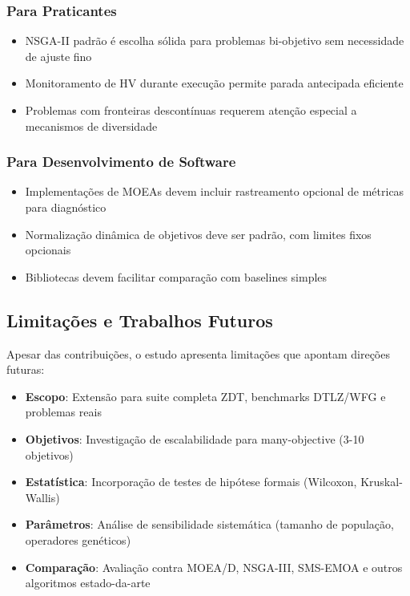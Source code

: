 \subsubsection{Para Praticantes}

\begin{itemize}
    \item NSGA-II padrão é escolha sólida para problemas bi-objetivo sem necessidade de ajuste fino
    \item Monitoramento de HV durante execução permite parada antecipada eficiente
    \item Problemas com fronteiras descontínuas requerem atenção especial a mecanismos de diversidade
\end{itemize}

\subsubsection{Para Desenvolvimento de Software}

\begin{itemize}
    \item Implementações de MOEAs devem incluir rastreamento opcional de métricas para diagnóstico
    \item Normalização dinâmica de objetivos deve ser padrão, com limites fixos opcionais
    \item Bibliotecas devem facilitar comparação com baselines simples
\end{itemize}

\subsection{Limitações e Trabalhos Futuros}

Apesar das contribuições, o estudo apresenta limitações que apontam direções futuras:

\begin{itemize}
    \item \textbf{Escopo}: Extensão para suite completa ZDT, benchmarks DTLZ/WFG e problemas reais
    \item \textbf{Objetivos}: Investigação de escalabilidade para many-objective (3-10 objetivos)
    \item \textbf{Estatística}: Incorporação de testes de hipótese formais (Wilcoxon, Kruskal-Wallis)
    \item \textbf{Parâmetros}: Análise de sensibilidade sistemática (tamanho de população, operadores genéticos)
    \item \textbf{Comparação}: Avaliação contra MOEA/D, NSGA-III, SMS-EMOA e outros algoritmos estado-da-arte
\end{itemize}

